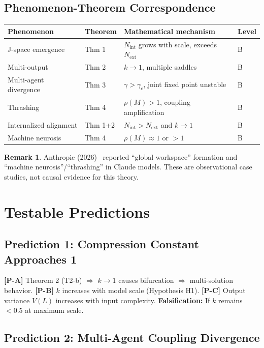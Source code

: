 \documentclass[12pt,a4paper]{article}
\theoremstyle{definition}
\newtheorem{remark}[theorem]{Remark}
\newcommand{\Nint}{N_{\mathrm{int}}}
\newcommand{\Next}{N_{\mathrm{ext}}}
\newcommand{\gamc}{\gamma_c}
\begin{document}
\subsection{Phenomenon-Theorem Correspondence}

\begin{longtable}{p{} p{} p{} p{}}
\toprule
Phenomenon & Theorem & Mathematical mechanism & Level \\
\midrule
J-space emergence & Thm 1 & $\Nint$ grows with scale, exceeds $\Next$ & B \\
Multi-output & Thm 2 & $k \to 1$, multiple saddles & B \\
Multi-agent divergence & Thm 3 & $\gamma > \gamc$, joint fixed point unstable & B \\
Thrashing & Thm 4 & $\rho(M) > 1$, coupling amplification & B \\
Internalized alignment & Thm 1+2 & $\Nint > \Next$ and $k \to 1$ & B \\
Machine neurosis & Thm 4 & $\rho(M) \approx 1$ or $> 1$ & B \\
\bottomrule
\end{longtable}

\begin{remark}
Anthropic (2026)~\cite{Anthropic2026a, Anthropic2026b} reported ``global workspace'' formation and ``machine neurosis''/``thrashing'' in Claude models. These are observational case studies, not causal evidence for this theory.
\end{remark}

\section{Testable Predictions}
\label{sec:predictions}

\subsection{Prediction 1: Compression Constant Approaches 1}

\textbf{[P-A]} Theorem 2 (T2-b) $\Rightarrow$ $k \to 1$ causes bifurcation $\Rightarrow$ multi-solution behavior. \textbf{[P-B]} $k$ increases with model scale (Hypothesis H1). \textbf{[P-C]} Output variance $V(L)$ increases with input complexity. \textbf{Falsification:} If $k$ remains $< 0.5$ at maximum scale.

\subsection{Prediction 2: Multi-Agent Coupling Divergence}
\end{document}
